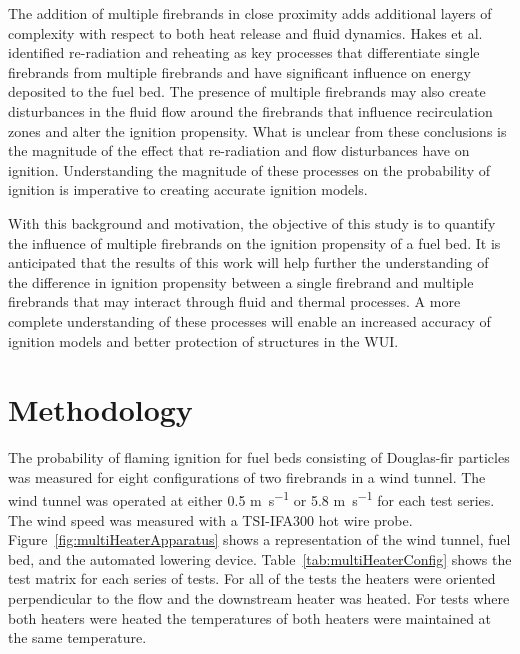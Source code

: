     The addition of multiple firebrands in close proximity adds additional layers of complexity with respect to both heat release and fluid dynamics.  Hakes et al.~\cite{Hakes2019a} identified re-radiation and reheating as key processes that differentiate single firebrands from multiple firebrands and have significant influence on energy deposited to the fuel bed.  The presence of multiple firebrands may also create disturbances in the fluid flow around the firebrands that influence recirculation zones and alter the ignition propensity. What is unclear from these conclusions is the magnitude of the effect that re-radiation and flow disturbances have on ignition. Understanding the magnitude of these processes on the probability of ignition is imperative to creating accurate ignition models. 
    
    With this background and motivation, the objective of this study is to quantify the influence of multiple firebrands on the ignition propensity of a fuel bed. It is anticipated that the results of this work will help further the understanding of the difference in ignition propensity between a single firebrand and multiple firebrands that may interact through fluid and thermal processes. A more complete understanding of these processes will enable an increased accuracy of ignition models and better protection of structures in the WUI.
    
    
\section{Methodology}
    The probability of flaming ignition for fuel beds consisting of Douglas-fir particles was measured for eight configurations of two firebrands in a wind tunnel. The wind tunnel was operated at either 0.5 \si{\meter\per\second} or 5.8 \si{\meter\per\second} for each test series. The wind speed was measured with a TSI-IFA300 hot wire probe. Figure~\ref{fig:multiHeaterApparatus} shows a representation of the wind tunnel, fuel bed, and the automated lowering device. Table~\ref{tab:multiHeaterConfig} shows the test matrix for each series of tests. For all of the tests the heaters were oriented perpendicular to the flow and the downstream heater was heated. For tests where both heaters were heated the temperatures of both heaters were maintained at the same temperature. 
    
